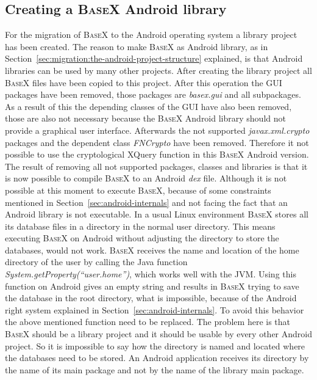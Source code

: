 \subsection{Creating a \textsc{BaseX} Android library}
\label{sec:migration:creating-a-basex-android-library}
For the migration of \textsc{BaseX} to the Android operating system a library project has been created.
The reason to make \textsc{BaseX} as Android library, as in Section~\ref{sec:migration:the-android-project-structure} explained, is that Android libraries can be used by many other projects.
After creating the library project all \textsc{BaseX} files have been copied to this project.
After this operation the GUI packages have been removed, those packages are \textit{basex.gui} and all subpackages.
As a result of this the depending classes of the GUI have also been removed, those are also not necessary because the \textsc{BaseX} Android library should not provide a graphical user interface.
Afterwards the not supported \textit{javax.xml.crypto} packages and the dependent class \textit{FNCrypto} have been removed.
Therefore it not possible to use the cryptological XQuery function in this \textsc{BaseX} Android version.\\
The result of removing all not supported packages, classes and libraries is that it is now possible to compile \textsc{BaseX} to an Android \textit{dex} file.
Although it is not possible at this moment to execute \textsc{BaseX}, because of some constraints mentioned in Section~\ref{sec:android-internals} and not facing the fact that an Android library is not executable.
In a usual Linux environment \textsc{BaseX} stores all its database files in a directory in the normal user directory.
This means executing \textsc{BaseX} on Android without adjusting the directory to store the databases, would not work.
\textsc{BaseX} receives the name and location of the home directory of the user by calling the Java function \textit{System.getProperty(``user.home'')}, which works well with the JVM.
Using this function on Android gives an empty string and results in \textsc{BaseX} trying to save the database in the root directory, what is impossible, because of the Android right system explained in Section~\ref{sec:android-internals}.
To avoid this behavior the above mentioned function need to be replaced.
The problem here is that \textsc{BaseX} should be a library project and it should be usable by every other Android project.
So it is impossible to say how the directory is named and located where the databases need to be stored.
An Android application receives its directory by the name of its main package and not by the name of the library main package.
